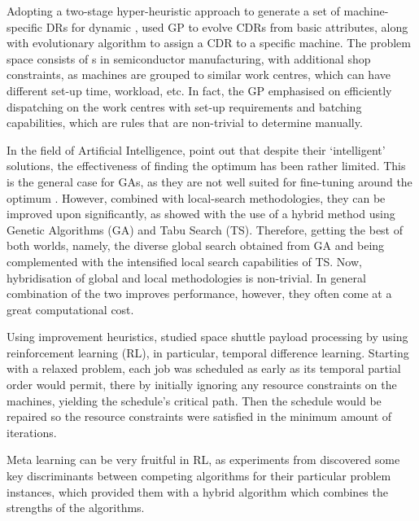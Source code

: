 \documentclass[smallextended]{svjour3}
\begin{document}
Adopting a two-stage hyper-heuristic approach to generate a set of 
machine-specific DRs for dynamic \jsp, \cite{Pickardt2013} used GP to evolve 
CDRs from basic attributes, along with evolutionary algorithm to assign a CDR 
to a specific machine. 
The problem space consists of \jsp s in semiconductor manufacturing, with 
additional shop constraints, as machines are grouped to similar work centres, 
which can have different set-up time, workload, etc. 
In fact, the GP emphasised on efficiently dispatching on the work 
centres with set-up requirements and batching capabilities, which are rules 
that are non-trivial to determine manually.

In the field of Artificial Intelligence, \cite{Meeran12} point out that despite 
their `intelligent' solutions, the effectiveness of finding the optimum has 
been rather limited. This is the general case for GAs, as they are not well 
suited for fine-tuning around the optimum \cite{Cheng99}. 
However, combined with local-search methodologies, they can be improved upon 
significantly, as \cite{Meeran12} showed with the use of a hybrid method using 
Genetic Algorithms (GA) and Tabu Search (TS). 
Therefore, getting the best of both worlds, namely, the diverse global search 
obtained from GA and being complemented with the intensified local search 
capabilities of TS. 
Now, hybridisation of global and local methodologies is non-trivial. In 
general combination of the two improves performance, however, they often come 
at a great computational cost.  



Using improvement heuristics, \cite{Zhang95} studied space shuttle payload 
processing by using reinforcement learning (RL), in particular, temporal 
difference learning. 
Starting with a relaxed problem, each job was scheduled as early as its 
temporal partial order would permit, there by initially ignoring any resource 
constraints on the machines, yielding the schedule's critical path. Then the 
schedule would be repaired so the resource constraints were satisfied in the 
minimum amount of iterations.

Meta learning can be very fruitful in RL, as experiments from 
\cite{Kalyanakrishnan11} discovered some key discriminants between 
competing algorithms for their particular problem instances, which provided 
them with a hybrid algorithm which combines the strengths of the algorithms.
\end{document}
